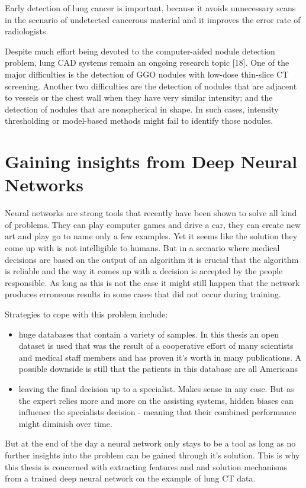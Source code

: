\documentclass[main.tex]{subfiles}
\begin{document}
Early detection of lung cancer is important, because it avoids unnecessary scans in the scenario
of undetected cancerous material and it improves the error rate of radiologists.

Despite much effort being devoted to the computer-aided nodule detection problem, lung CAD systems remain an ongoing
research topic [18]. One of the major difficulties is the detection of GGO nodules with low-dose thin-slice CT screening. Another two difficulties are the detection of nodules that are adjacent to vessels or the chest wall when they have very similar intensity; and the detection of nodules that are nonspherical in shape. In such cases, intensity thresholding or model-based methods might fail to identify those nodules.

\section{Gaining insights from Deep Neural Networks}
Neural networks are strong tools that recently have been shown to solve all kind of problems. They can play
computer games and drive a car, they can create new art and play go to name only a few examples. Yet it seems like the solution they come up with is not intelligible to humans. But in a scenario where medical decisions are based on the output of an algorithm it is crucial that the algorithm is reliable and the way it comes up with a decision is accepted by the people responsible. As long as this is not the case it might still happen that the network produces erroneous results in some cases that did not occur during training.

Strategies to cope with this problem include:
\begin{itemize}
\item huge databases that contain a variety of samples. In this thesis an open dataset is used that was
the result of a cooperative effort of many scientists and medical staff members and has proven
it's worth in many publications. A possible downside is still that the patients in this database are all Americans

\item leaving the final decision up to a specialist. Makes sense in any case. But as the expert relies more and more on the assisting systems, hidden biases can influence the specialists decision - meaning that their combined performance might diminish over time.
\end{itemize}


But at the end of the day a neural network only stays to be a tool as long as no further insights into
the problem can be gained through it's solution. This is why this thesis is concerned with extracting
features and and solution mechanisms from a trained deep neural network on the example of lung CT data.
\end{document}
